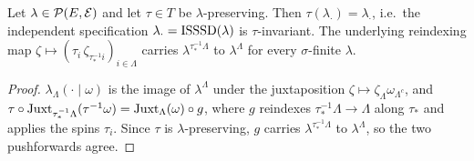\begin{proposition}[Georgii (5.6)(a)]
    \label{prop:trans-isssd-invariant}
    \leanok

    Let $\lambda \in \mathcal{P}(E, \mathcal{E})$ and let $\tau \in T$ be $\lambda$-preserving.  Then
    $\tau(\lambda_\cdot) = \lambda_\cdot$, i.e.\ the independent specification
    $\lambda_\cdot = \operatorname{ISSSD}(\lambda)$ is $\tau$-invariant.  The underlying reindexing map
    $\zeta \mapsto (\tau_i\,\zeta_{\tau_*^{-1}i})_{i \in \Lambda}$ carries
    $\lambda^{\tau_*^{-1}\Lambda}$ to $\lambda^\Lambda$ for every $\sigma$-finite $\lambda$.
\end{proposition}
\begin{proof}
    \leanok

    $\lambda_\Lambda(\cdot\mid\omega)$ is the image of $\lambda^\Lambda$ under the
    juxtaposition $\zeta \mapsto \zeta_\Lambda \omega_{\Lambda^c}$, and
    $\tau \circ \operatorname{Juxt}_{\tau_*^{-1}\Lambda}(\tau^{-1}\omega) = \operatorname{Juxt}_{\Lambda}(\omega) \circ g$,
    where $g$ reindexes $\tau_*^{-1}\Lambda \to \Lambda$ along $\tau_*$ and applies the spins
    $\tau_i$.  Since $\tau$ is $\lambda$-preserving, $g$ carries
    $\lambda^{\tau_*^{-1}\Lambda}$ to $\lambda^{\Lambda}$, so the two pushforwards agree.
\end{proof}

